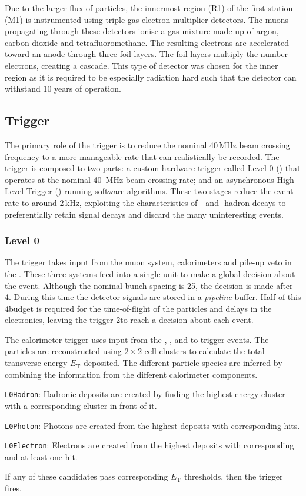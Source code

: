 Due to the larger flux of particles, the innermost region (R1) of the first station (M1) is instrumented using triple gas electron multiplier detectors. The muons propagating through these detectors ionise a gas mixture made up of argon, carbon dioxide and tetrafluoromethane. The resulting electrons are accelerated toward an anode through three foil layers. The foil layers multiply the number electrons, creating a cascade. 
This type of detector was chosen for the inner region as it is required to be especially radiation hard such that the detector can withstand 10 years of operation.  

\subsection{Trigger}
\label{sec:Dec_trigger}

The primary role of the trigger is to reduce the nominal 40\,MHz beam crossing frequency to a more manageable rate that can realistically be recorded. The trigger is composed to two parts: a custom hardware trigger called Level 0 (\lone) that operates at the nominal 40\, MHz beam crossing rate; and an asynchronous High Level Trigger (\hlt) running software algorithms. These two stages reduce the event rate to around 2\,kHz, exploiting the characteristics of \bquark- and \cquark-hadron decays to preferentially retain signal decays and discard the many uninteresting events.

\subsubsection{Level 0}
The \lone trigger takes input from the muon system, calorimeters and pile-up veto in the \velo. These three systems feed into a single unit to make a global decision about the event. Although the nominal bunch spacing is 25\ns, the \lone decision is made after 4\mus. During this time the detector signals are stored in a \emph{pipeline} buffer. Half of this 4\mus budget is required for the time-of-flight of the particles and delays in the electronics, leaving the \lone trigger 2\mus to reach a decision about each event.  

The \lone calorimeter trigger uses input from the \spd, \presh, \ecal and \hcal to trigger events. The particles are reconstructed using $2\times2$ cell clusters to calculate the total transverse energy $E_{\text{T}}$ deposited. 
The different particle species are inferred by combining the information from the different calorimeter components.
\begin{description}
\item \texttt{L0Hadron}: Hadronic deposits are created by finding the highest energy \hcal cluster with a corresponding \ecal cluster in front of it.  
\item \texttt{L0Photon}: Photons are created from the highest \ecal deposits with corresponding \presh hits. 
\item \texttt{L0Electron}: Electrons are created from the highest \ecal deposits with corresponding \presh and at least one \spd hit. 
\end{description}
If any of these candidates pass corresponding $E_{\text{T}}$ thresholds, then the trigger fires. 

